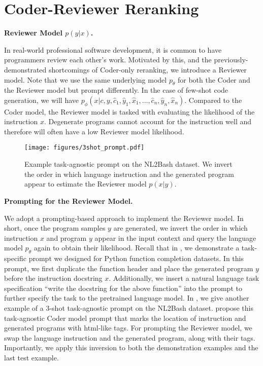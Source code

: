 \documentclass[nohyperref]{article}
\theoremstyle{plain}
\theoremstyle{definition}
\theoremstyle{remark}
\renewcommand{\paragraph}[1]{
     \textbf{#1} 
 }
\begin{document}
\section{Coder-Reviewer Reranking}
\label{sec:coder-reviewer}
\paragraph{Reviewer Model $p(y|x)$.}
In real-world professional software development, it is common to have programmers review each other's work.    
Motivated by this, and the previously-demonstrated shortcomings of Coder-only reranking, we introduce a Reviewer model.
Note that we use the same underlying model $p_{\theta}$ for both the Coder and the Reviewer model but prompt differently.
In the case of few-shot code generation, we will have $p_{\phi}(x|c, y, \hat{c}_{1}, \hat{y}_{1}, \hat{x}_{1}, \ldots, \hat{c}_{n}, \hat{y}_{n}, \hat{x}_{n})$.
Compared to the Coder model, the Reviewer model is tasked with evaluating the likelihood of the instruction $x$.
Degenerate programs cannot account for the instruction well and therefore will often have a low Reviewer model likelihood.

\begin{figure}[t]
     \centering
     \texttt{[image: figures/3shot\_prompt.pdf]}
     \caption{Example task-agnostic prompt on the NL2Bash dataset. We invert the order in which language instruction and the generated program appear to estimate the Reviewer model $p(x|y)$.}
     \label{fig:prompt_example}
     \vspace{-15pt}
\end{figure}

\paragraph{Prompting for the Reviewer Model.}
We adopt a prompting-based approach to implement the Reviewer model.
In short, once the program samples $y$ are generated, we invert the order in which instruction $x$ and program $y$ appear in the input context and query the language model $p_{\theta}$ again to obtain their likelihood.
Recall that in , we demonstrate a task-specific prompt we designed for Python function completion datasets.
In this prompt, we first duplicate the function header and place the generated program $y$ before the instruction docstring $x$.
Additionally, we insert a natural language task specification ``write the docstring for the above function'' into the prompt to further specify the task to the pretrained language model.
In , we give another example of a 3-shot task-agnostic prompt on the NL2Bash dataset.
\citet{mbr} propose this task-agnostic Coder model prompt that marks the location of instruction and generated programs with html-like tags.
For prompting the Reviewer model, we swap the language instruction and the generated program, along with their tags.
Importantly, we apply this inversion to both the demonstration examples and the last test example.
\end{document}
